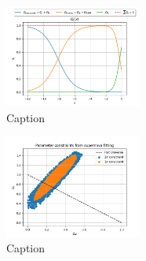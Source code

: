 \begin{figure}[h!tbp]
\centering
\includegraphics[width=0.4\textwidth]{../Milestone 1/Plots/Omega_i_of_x.png}
\caption{Caption}
\label{fig:milestone_1_Omega_i_of_x}
\end{figure}

\begin{figure}[h!tbp]
\centering
\includegraphics[width=0.4\textwidth]{../Milestone 1/Plots/supernovafitting_confidence_regions.png}
\caption{Caption}
\label{fig:milestone_1_supernovafitting_confidence_regions}
\end{figure}
